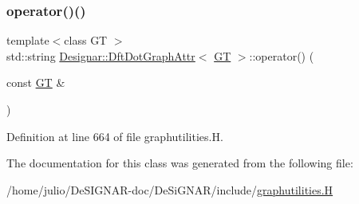\subsubsection{\texorpdfstring{operator()()}{operator()()}}
{\footnotesize\ttfamily template$<$class GT $>$ \\
std\+::string \hyperlink{class_designar_1_1_dft_dot_graph_attr}{Designar\+::\+Dft\+Dot\+Graph\+Attr}$<$ \hyperlink{demo-buildgraph_8_c_a3001c40d2c31ca87ed96cd7d1334a55e}{GT} $>$\+::operator() (\begin{DoxyParamCaption}\item[{const \hyperlink{demo-buildgraph_8_c_a3001c40d2c31ca87ed96cd7d1334a55e}{GT} \&}]{ }\end{DoxyParamCaption})\hspace{0.3cm}{\ttfamily [inline]}}



Definition at line 664 of file graphutilities.\+H.



The documentation for this class was generated from the following file\+:\begin{DoxyCompactItemize}
\item 
/home/julio/\+De\+S\+I\+G\+N\+A\+R-\/doc/\+De\+Si\+G\+N\+A\+R/include/\hyperlink{graphutilities_8_h}{graphutilities.\+H}\end{DoxyCompactItemize}
